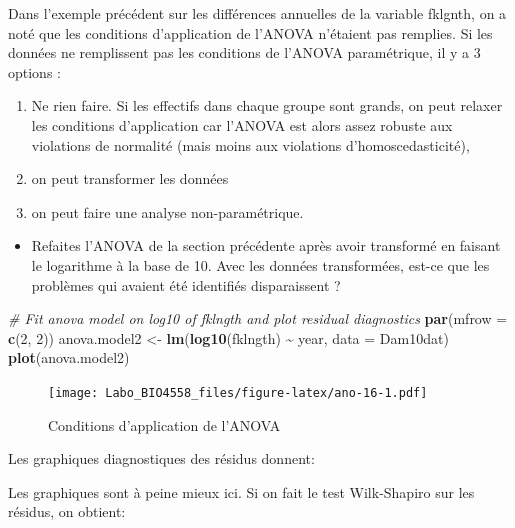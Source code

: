 \documentclass[
  12pt,
]{book}
\newenvironment{Shaded}{\begin{snugshade}}{\end{snugshade}}
\newcommand{\CommentTok}[1]{\textcolor[rgb]{0.56,0.35,0.01}{\textit{#1}}}
\newcommand{\DataTypeTok}[1]{\textcolor[rgb]{0.13,0.29,0.53}{#1}}
\newcommand{\DecValTok}[1]{\textcolor[rgb]{0.00,0.00,0.81}{#1}}
\newcommand{\KeywordTok}[1]{\textcolor[rgb]{0.13,0.29,0.53}{\textbf{#1}}}
\newcommand{\NormalTok}[1]{#1}
\newcommand{\OperatorTok}[1]{\textcolor[rgb]{0.81,0.36,0.00}{\textbf{#1}}}
\newcommand{\StringTok}[1]{\textcolor[rgb]{0.31,0.60,0.02}{#1}}
\providecommand{\tightlist}{%
  \setlength{\itemsep}{0pt}\setlength{\parskip}{0pt}}
\begin{document}
Dans l'exemple précédent sur les différences annuelles de la variable fklgnth, on a noté que les conditions d'application de l'ANOVA n'étaient pas remplies. Si les données ne remplissent pas les conditions de l'ANOVA paramétrique, il y a 3 options :

\begin{enumerate}
\def\labelenumi{\arabic{enumi}.}
\tightlist
\item
  Ne rien faire. Si les effectifs dans chaque groupe sont grands, on peut relaxer les conditions d'application car l'ANOVA est alors assez robuste aux violations de normalité (mais moins aux violations d'homoscedasticité),
\item
  on peut transformer les données
\item
  on peut faire une analyse non-paramétrique.
\end{enumerate}

\begin{itemize}
\tightlist
\item
  Refaites l'ANOVA de la section précédente après avoir transformé en faisant le logarithme à la base de 10. Avec les données transformées, est-ce que les problèmes qui avaient été identifiés disparaissent ?
\end{itemize}

\begin{Shaded}
\begin{Highlighting}[]
\CommentTok{\# Fit anova model on log10 of fklngth and plot residual diagnostics}
\KeywordTok{par}\NormalTok{(}\DataTypeTok{mfrow =} \KeywordTok{c}\NormalTok{(}\DecValTok{2}\NormalTok{, }\DecValTok{2}\NormalTok{))}
\NormalTok{anova.model2 \textless{}{-}}\StringTok{ }\KeywordTok{lm}\NormalTok{(}\KeywordTok{log10}\NormalTok{(fklngth) }\OperatorTok{\textasciitilde{}}\StringTok{ }\NormalTok{year, }\DataTypeTok{data =}\NormalTok{ Dam10dat)}
\KeywordTok{plot}\NormalTok{(anova.model2)}
\end{Highlighting}
\end{Shaded}

\begin{figure}
\centering
\texttt{[image: Labo\_BIO4558\_files/figure-latex/ano-16-1.pdf]}
\caption{\label{fig:ano-16}Conditions d'application de l'ANOVA}
\end{figure}

Les graphiques diagnostiques des résidus donnent:

Les graphiques sont à peine mieux ici. Si on fait le test Wilk-Shapiro sur les résidus, on obtient:
\end{document}
